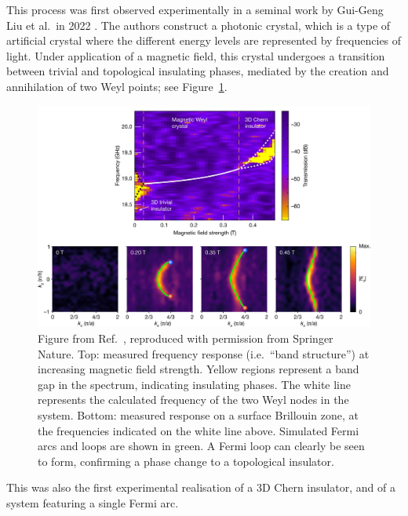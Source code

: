 This process was first observed experimentally in a seminal work by Gui-Geng Liu et al.\ in 2022 \cite{Liu_photonic-Chern-vector}. The authors construct a photonic crystal, which is a type of artificial crystal where the different energy levels are represented by frequencies of light. Under application of a magnetic field, this crystal undergoes a transition between trivial and topological insulating phases, mediated by the creation and annihilation of two Weyl points; see Figure~\ref{fig:Weyl-phase-transition}.
\begin{figure}[htb!]
	\centering
	\includegraphics[width=\linewidth]{Images/Weyl-phase-transition}
	\caption{Figure from Ref.~\cite{Liu_photonic-Chern-vector}, reproduced with permission from Springer Nature.
		Top: measured frequency response (i.e.\ ``band structure'') at increasing magnetic field strength. Yellow regions represent a band gap in the spectrum, indicating insulating phases. The white line represents the calculated frequency of the two Weyl nodes in the system. Bottom: measured response on a surface Brillouin zone, at the frequencies indicated on the white line above. Simulated Fermi arcs and loops are shown in green. A Fermi loop can clearly be seen to form, confirming a phase change to a topological insulator.}
	\label{fig:Weyl-phase-transition}
\end{figure}
This was also the first experimental realisation of a 3D Chern insulator, and of a system featuring a single Fermi arc.

